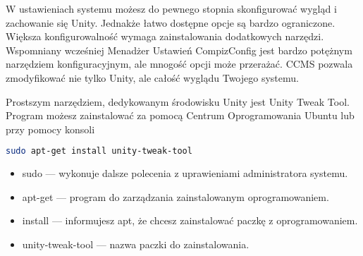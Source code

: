 W \textcolor{ubuntu_orange}{ustawieniach systemu} możesz do pewnego stopnia skonfigurować wygląd i zachowanie się Unity. Jednakże łatwo dostępne opcje są bardzo ograniczone. Większa konfigurowalność wymaga zainstalowania dodatkowych narzędzi. Wspomniany wcześniej Menadżer Ustawień CompizConfig jest bardzo potężnym narzędziem konfiguracyjnym, ale mnogość opcji może przerażać. CCMS pozwala zmodyfikować nie tylko Unity, ale całość wyglądu Twojego systemu.

Prostszym narzędziem, dedykowanym środowisku Unity jest \textcolor{ubuntu_orange}{Unity Tweak Tool}. Program możesz zainstalować za pomocą Centrum Oprogramowania Ubuntu lub przy pomocy konsoli
\begin{lstlisting}[language=bash]
sudo apt-get install unity-tweak-tool
\end{lstlisting}
\begin{itemize}
\item \textcolor{ubuntu_orange}{sudo} --- wykonuje dalsze polecenia z uprawieniami administratora systemu.
\item \textcolor{ubuntu_orange}{apt-get} --- program do zarządzania zainstalowanym oprogramowaniem.
\item \textcolor{ubuntu_orange}{install} --- informujesz apt, że chcesz zainstalować paczkę z oprogramowaniem.
\item \textcolor{ubuntu_orange}{unity-tweak-tool} --- nazwa paczki do zainstalowania.
\end{itemize}